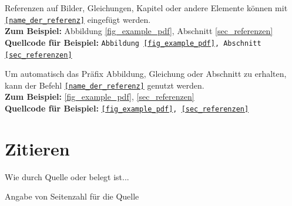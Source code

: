 Referenzen auf Bilder, Gleichungen, Kapitel oder andere Elemente können mit \texttt{\ref{name_der_referenz}} eingefügt werden. \\
\textbf{Zum Beispiel:} Abbildung \ref{fig_example_pdf}, Abschnitt \ref{sec_referenzen} \\
\textbf{Quellcode für Beispiel:} \texttt{Abbildung \ref{fig_example_pdf}, Abschnitt \ref{sec_referenzen}}

Um automatisch das Präfix \glqq Abbildung\grqq{}, \glqq Gleichung\grqq{} oder \glqq  Abschnitt\grqq{} zu erhalten, kann der Befehl \texttt{\autoref{name_der_referenz}} genutzt werden. \\
\textbf{Zum Beispiel:} \autoref{fig_example_pdf}, \autoref{sec_referenzen} \\
\textbf{Quellcode für Beispiel:} \texttt{\autoref{fig_example_pdf}, \autoref{sec_referenzen}}

\section{Zitieren}
Wie durch Quelle \cite{Nobody05} oder \cite{Nobody06} belegt ist...

Angabe von Seitenzahl für die Quelle \cite[S. 5ff]{Nobody07}

